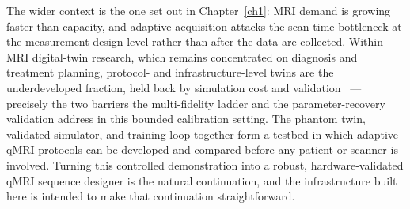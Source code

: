 The wider context is the one set out in Chapter~\ref{ch1}: MRI demand is
growing faster than capacity, and adaptive acquisition attacks the scan-time
bottleneck at the measurement-design level rather than after the data are
collected. Within MRI digital-twin research, which remains concentrated on
diagnosis and treatment planning, protocol- and infrastructure-level twins
are the underdeveloped fraction, held back by simulation cost and
validation~\cite{greggio_digital_twinning_mri_2026} --- precisely the two
barriers the multi-fidelity ladder and the parameter-recovery validation
address in this bounded calibration setting. The phantom twin, validated
simulator, and training loop together form a testbed in which adaptive qMRI
protocols can be developed and compared before any patient or scanner is
involved. Turning this controlled demonstration into a robust,
hardware-validated qMRI sequence designer is the natural continuation, and
the infrastructure built here is intended to make that continuation
straightforward.
